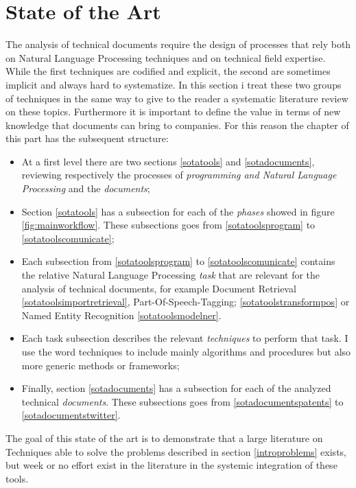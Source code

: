 \documentclass[]{book}
\theoremstyle{definition}
\theoremstyle{definition}
\theoremstyle{definition}
\theoremstyle{remark}
\begin{document}
\part{State of the Art}\label{part-state-of-the-art}

The analysis of technical documents require the design of processes that
rely both on Natural Language Processing techniques and on technical
field expertise. While the first techniques are codified and explicit,
the second are sometimes implicit and always hard to systematize. In
this section i treat these two groups of techniques in the same way to
give to the reader a systematic literature review on these topics.
Furthermore it is important to define the value in terms of new
knowledge that documents can bring to companies. For this reason the
chapter of this part has the subsequent structure:

\begin{itemize}
\item
  At a first level there are two sections \ref{sotatools} and
  \ref{sotadocuments}, reviewing respectively the processes of
  \emph{programming and Natural Language Processing} and the
  \emph{documents};
\item
  Section \ref{sotatools} has a subsection for each of the \emph{phases}
  showed in figure \ref{fig:mainworkflow}. These subsections goes from
  \ref{sotatoolsprogram} to \ref{sotatoolscomunicate};
\item
  Each subsection from \ref{sotatoolsprogram} to
  \ref{sotatoolscomunicate} contains the relative Natural Language
  Processing \emph{task} that are relevant for the analysis of technical
  documents, for example Document Retrieval
  \ref{sotatoolsimportretrieval}, Part-Of-Speech-Tagging;
  \ref{sotatoolstransformpos} or Named Entity Recognition
  \ref{sotatoolsmodelner}.
\item
  Each task subsection describes the relevant \emph{techniques} to
  perform that task. I use the word techniques to include mainly
  algorithms and procedures but also more generic methods or frameworks;
\item
  Finally, section \ref{sotadocuments} has a subsection for each of the
  analyzed technical \emph{documents}. These subsections goes from
  \ref{sotadocumentspatents} to \ref{sotadocumentstwitter}.
\end{itemize}

The goal of this state of the art is to demonstrate that a large
literature on Techniques able to solve the problems described in section
\ref{introproblems} exists, but week or no effort exist in the
literature in the systemic integration of these tools.
\end{document}
